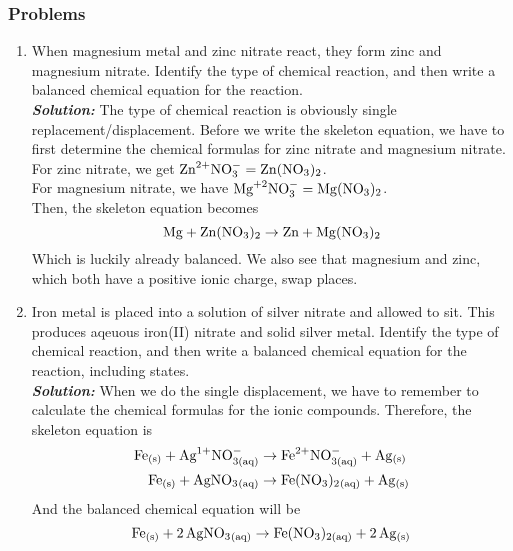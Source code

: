 \documentclass[12pt]{report}
\begin{document}
\subsubsection{Problems}
\begin{enumerate}
\setlength\itemsep{0.5em}
    \item{When magnesium metal and zinc nitrate react, they form zinc and magnesium nitrate. Identify the type of chemical reaction, and then write a balanced chemical equation for the reaction.}\\

    \textit{\textbf{Solution:}} The type of chemical reaction is obviously single replacement/displacement. Before we write the skeleton equation, we have to first determine the chemical formulas for zinc nitrate and magnesium nitrate.\\

    For zinc nitrate, we get $ \text{Zn}^{2+} \text{NO}^{-}_{3}= \ce{Zn(NO3)2}$.\\

    For magnesium nitrate, we have $ \text{Mg}^{+2} \text{NO}^{-}_{3}= \ce{Mg(NO3)2}$.\\

    Then, the skeleton equation becomes 
    \[
        \ce{Mg}+ \ce{Zn(NO3)2}\to \ce{Zn}+ \ce{Mg(NO3)2}
    \]
    Which is luckily already balanced. We also see that magnesium and zinc, which both have a positive ionic charge, swap places.  

    \item{Iron metal is placed into a solution of silver nitrate and allowed to sit. This produces aqeuous iron(II) nitrate and solid silver metal. Identify the type of chemical reaction, and then write a balanced chemical equation for the reaction, including states.}\\
    
    \textit{\textbf{Solution:}} When we do the single displacement, we have to remember to calculate the chemical formulas for the ionic compounds. Therefore, the skeleton equation is 
    \begin{align*}
        \ce{Fe_{(s)}}+ \text{Ag}^{1+}_{} \text{NO}^{-}_{\text{3(aq)}}&\to \text{Fe}^{2+} \text{NO}^{-}_{3( \text{aq} )}+ \ce{Ag_{(s)}}\\
        \ce{Fe_{(s)}}+ \ce{AgNO3_{( aq )}}&\to \ce{Fe(NO3)2_{(aq)}}+ \ce{Ag_{(s)}}
    \end{align*}
    And the balanced chemical equation will be 
    \[
        \ce{Fe_{(s)}}+ \ce{2AgNO3_{(aq)}}\to \ce{Fe(NO3)_{\text{2(aq)}}}+ \ce{2Ag_{(s)}}
    \]


\end{enumerate}
\end{document}
